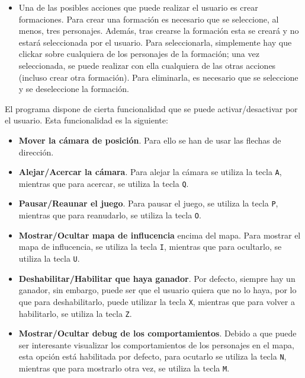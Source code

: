 \begin{itemize}
 \item Una de las posibles acciones que puede realizar el usuario es crear formaciones. Para crear una formación es necesario que se seleccione, al menos, tres personajes. Además, tras crearse la formación esta se creará y no estará seleccionada por el usuario. Para seleccionarla, simplemente hay que clickar sobre cualquiera de los personajes de la formación; una vez seleccionada, se puede realizar con ella cualquiera de las otras acciones (incluso crear otra formación). Para eliminarla, es necesario que se seleccione y se deseleccione la formación.
\end{itemize}

El programa dispone de cierta funcionalidad que se puede activar/desactivar por el usuario. Esta funcionalidad es la siguiente:
\begin{itemize}
 \item \textbf{Mover la cámara de posición}. Para ello se han de usar las flechas de dirección.
 \item \textbf{Alejar/Acercar la cámara}. Para alejar la cámara se utiliza la tecla \texttt{A}, mientras que para acercar, se utiliza la tecla \texttt{Q}.
 \item \textbf{Pausar/Reaunar el juego}. Para pausar el juego, se utiliza la tecla \texttt{P}, mientras que para reanudarlo, se utiliza la tecla \texttt{O}.
 \item \textbf{Mostrar/Ocultar mapa de influcencia} encima del mapa. Para mostrar el mapa de influcencia, se utiliza la tecla \texttt{I}, mientras que para ocultarlo, se utiliza la tecla \texttt{U}.
 \item \textbf{Deshabilitar/Habilitar que haya ganador}. Por defecto, siempre hay un ganador, sin embargo, puede ser que el usuario quiera que no lo haya, por lo que para deshabilitarlo, puede utilizar la tecla \texttt{X}, mientras que para volver a habilitarlo, se utiliza la tecla \texttt{Z}.
 \item \textbf{Mostrar/Ocultar debug de los comportamientos}. Debido a que puede ser interesante visualizar los comportamientos de los personajes en el mapa, esta opción está habilitada por defecto, para ocutarlo se utiliza la tecla \texttt{N}, mientras que para mostrarlo otra vez, se utiliza la tecla \texttt{M}.
\end{itemize}
